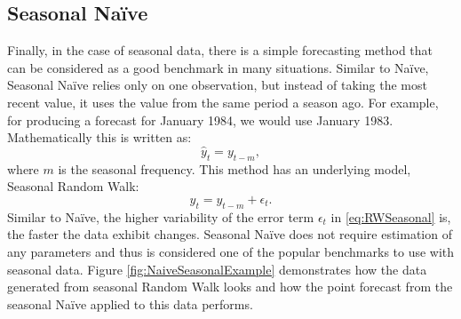 \documentclass[
]{book}
\newenvironment{Shaded}{\begin{snugshade}}{\end{snugshade}}
\newcommand{\AttributeTok}[1]{\textcolor[rgb]{0.77,0.63,0.00}{#1}}
\newcommand{\ConstantTok}[1]{\textcolor[rgb]{0.00,0.00,0.00}{#1}}
\newcommand{\DecValTok}[1]{\textcolor[rgb]{0.00,0.00,0.81}{#1}}
\newcommand{\FunctionTok}[1]{\textcolor[rgb]{0.00,0.00,0.00}{#1}}
\newcommand{\NormalTok}[1]{#1}
\newcommand{\OtherTok}[1]{\textcolor[rgb]{0.56,0.35,0.01}{#1}}
\newcommand{\SpecialCharTok}[1]{\textcolor[rgb]{0.00,0.00,0.00}{#1}}
\newcommand{\StringTok}[1]{\textcolor[rgb]{0.31,0.60,0.02}{#1}}
\theoremstyle{definition}
\theoremstyle{definition}
\theoremstyle{definition}
\theoremstyle{definition}
\theoremstyle{remark}
\begin{document}
\hypertarget{NaiveSeasonal}{%
\subsection{Seasonal Naïve}\label{NaiveSeasonal}}

Finally, in the case of seasonal data, there is a simple forecasting method that can be considered as a good benchmark in many situations. Similar to Naïve, Seasonal Naïve relies only on one observation, but instead of taking the most recent value, it uses the value from the same period a season ago. For example, for producing a forecast for January 1984, we would use January 1983. Mathematically this is written as:
\begin{equation}
    \hat{y}_t = y_{t-m} ,
    \label{eq:NaiveSeasonal}
\end{equation}
where \(m\) is the seasonal frequency. This method has an underlying model, Seasonal Random Walk:
\begin{equation}
    y_t = y_{t-m} + \epsilon_t.
    \label{eq:RWSeasonal}
\end{equation}
Similar to Naïve, the higher variability of the error term \(\epsilon_t\) in \eqref{eq:RWSeasonal} is, the faster the data exhibit changes. Seasonal Naïve does not require estimation of any parameters and thus is considered one of the popular benchmarks to use with seasonal data. Figure \ref{fig:NaiveSeasonalExample} demonstrates how the data generated from seasonal Random Walk looks and how the point forecast from the seasonal Naïve applied to this data performs.

\begin{Shaded}
\end{Shaded}
\end{document}
